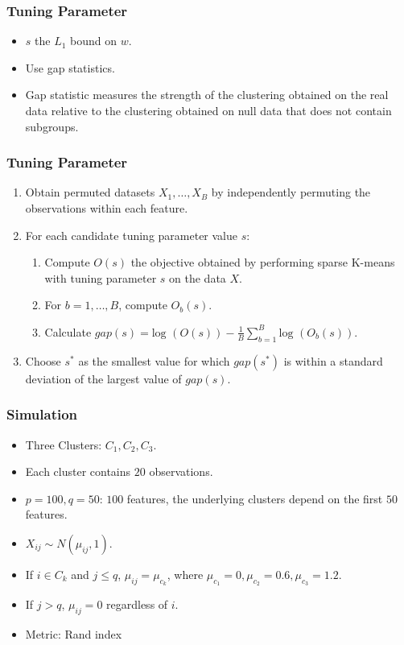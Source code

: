 \documentclass{beamer}
\begin{document}
\begin{frame}
\frametitle{Tuning Parameter}

\begin{itemize}
    \item $s$ the $L_1$ bound on $w$.
    \item Use gap statistics.
    \item Gap statistic measures the strength of the clustering obtained on the real data relative to the clustering obtained on null data that does not contain subgroups.
\end{itemize}

\end{frame}
\begin{frame}
\frametitle{Tuning Parameter}
\begin{enumerate}
\item Obtain permuted datasets $X_1,\ldots, X_B$ by independently permuting the observations within each feature.
\item For each candidate tuning parameter value $s$:
    \begin{enumerate}
    \item Compute $O(s)$ the objective obtained by performing sparse K-means with tuning parameter $s$ on the data $X$.
   \item For $b = 1,\ldots,B$, compute $O_b(s)$.
   \item Calculate $gap(s) = \text{log }(O(s)) - \frac{1}{B} \sum_{b=1}^B \text{log }(O_b(s))$.
   \end{enumerate}
\item Choose $s^*$ as the smallest value for which $gap(s^*)$ is within a standard deviation of the largest value of $gap(s)$.
\end{enumerate}
\end{frame}
\begin{frame}
\frametitle{Simulation}
\begin{itemize}
    \item Three Clusters: $C_1,C_2,C_3$.
    \item Each cluster contains $20$ observations.
    \item $p=100,q=50$: $100$ features, the underlying clusters depend on the first $50$ features.
    \item $X_{ij} \sim N(\mu_{ij},1)$.
    \item If $i \in C_k$ and $j \le q$, $\mu_{ij} = \mu_{c_k}$, where $\mu_{c_1}= 0,\mu_{c_2}=0.6,\mu_{c_3}=1.2$.
    \item If $j > q$, $\mu_{ij} = 0$ regardless of $i$.
    \item Metric: Rand index
\end{itemize}

\end{frame}
\end{document}
